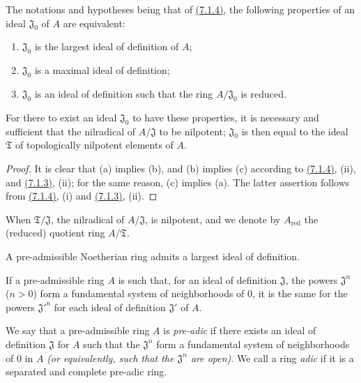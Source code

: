 \begin{cor}[7.1.6]
\label{0.7.1.6}
The notations and hypotheses being that of \hyperref[0.7.1.4]{(7.1.4)}, the following
properties of an ideal $\mathfrak{J}_0$ of $A$ are equivalent:
\begin{enumerate}[label={\rm(\alph*)}]
  \item $\mathfrak{J}_0$ is the largest ideal of definition of $A$;
  \item $\mathfrak{J}_0$ is a maximal ideal of definition;
  \item $\mathfrak{J}_0$ is an ideal of definition such that the ring $A/\mathfrak{J}_0$ is reduced.
\end{enumerate}
For there to exist an ideal $\mathfrak{J}_0$ to have these properties, it is
necessary and sufficient that the nilradical of $A/\mathfrak{J}$ to be
nilpotent; $\mathfrak{J}_0$ is then equal to the ideal $\mathfrak{T}$ of
topologically nilpotent elements of $A$.
\end{cor}

\begin{proof}
\label{proof-0.7.1.6}
It is clear that (a) implies (b), and (b) implies (c) according to
\hyperref[0.7.1.4]{(7.1.4)}, (ii), and \hyperref[0.7.1.3]{(7.1.3)}, (ii); for the same
reason, (c) implies (a). The latter assertion follows from \hyperref[0.7.1.4]{(7.1.4)}, (i) and
\hyperref[0.7.1.3]{(7.1.3)}, (ii).
\end{proof}

When $\mathfrak{T}/\mathfrak{J}$, the nilradical of $A/\mathfrak{J}$, is
nilpotent, and we denote by $A_\text{red}$ the (reduced) quotient ring
$A/\mathfrak{T}$.

\begin{cor}[7.1.7]
\label{0.7.1.7}
A pre-admissible Noetherian ring admits a largest ideal of definition.
\end{cor}

\begin{cor}[7.1.8]
\label{0.7.1.8}
If a pre-admissible ring $A$ is such that, for an ideal of definition
$\mathfrak{J}$, the powers $\mathfrak{J}^n$ ($n>0$) form a fundamental system
of neighborhoods of $0$, it is the same for the powers ${\mathfrak{J}'}^n$ for
each ideal of definition $\mathfrak{J}'$ of $A$.
\end{cor}

\begin{defn}[7.1.9]
\label{0.7.1.9}
We say that a pre-admissible ring $A$ is {\em pre-adic} if there exists an
ideal of definition $\mathfrak{J}$ for $A$ such that the $\mathfrak{J}^n$ form
a fundamental system of neighborhoods of $0$ in $A$ {\em (or equivalently, such
that the $\mathfrak{J}^n$ are {\em open})}. We call a ring {\em adic} if it
is a separated and complete pre-adic ring.
\end{defn}

